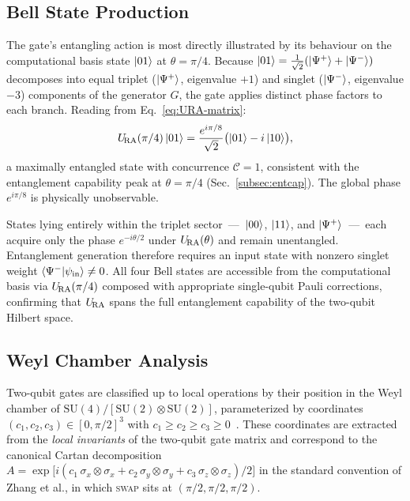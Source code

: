 \subsection{Bell State Production}
\label{subsec:bell}

The gate's entangling action is most directly illustrated by its
behaviour on the computational basis state $\ket{01}$ at $\theta = \pi/4$.
Because $\ket{01} = \tfrac{1}{\sqrt{2}}(\ket{\Psi^+} + \ket{\Psi^-})$
decomposes into equal triplet ($\ket{\Psi^+}$, eigenvalue $+1$) and
singlet ($\ket{\Psi^-}$, eigenvalue $-3$) components of the generator $G$,
the gate applies distinct phase factors to each branch.
Reading from Eq.~\eqref{eq:URA-matrix}:
\begin{equation}
  U_{\!\mathrm{RA}}(\pi/4)\ket{01}
    = \frac{e^{i\pi/8}}{\sqrt{2}}\bigl(\ket{01} - i\ket{10}\bigr),
  \label{eq:bell-production}
\end{equation}
a maximally entangled state with concurrence $\mathcal{C} = 1$,
consistent with the entanglement capability peak at $\theta = \pi/4$
(Sec.~\ref{subsec:entcap}).
The global phase $e^{i\pi/8}$ is physically unobservable.

States lying entirely within the triplet sector~---~$\ket{00}$, $\ket{11}$,
and $\ket{\Psi^+}$~---~each acquire only the phase $e^{-i\theta/2}$ under
$U_{\!\mathrm{RA}}(\theta)$ and remain unentangled.
Entanglement generation therefore requires an input state with nonzero
singlet weight $\langle\Psi^-\vert\psi_{\rm in}\rangle \neq 0$.
All four Bell states are accessible from the computational basis via
$U_{\!\mathrm{RA}}(\pi/4)$ composed with appropriate single-qubit Pauli corrections,
confirming that $U_{\!\mathrm{RA}}$ spans the full entanglement capability of the
two-qubit Hilbert space.

\subsection{Weyl Chamber Analysis}
\label{subsec:weyl}

Two-qubit gates are classified up to local operations by their position in
the Weyl chamber of $\mathrm{SU}(4)/[\mathrm{SU}(2)\otimes\mathrm{SU}(2)]$,
parameterized by coordinates $(c_1, c_2, c_3) \in [0,\pi/2]^3$ with
$c_1 \geq c_2 \geq c_3 \geq 0$~\cite{Zhang2003WeylChamber}.
These coordinates are extracted from the \emph{local invariants} of the
two-qubit gate matrix and correspond to the canonical Cartan
decomposition $A = \exp\!\bigl[i(c_1\,\sigma_x{\otimes}\sigma_x +
c_2\,\sigma_y{\otimes}\sigma_y + c_3\,\sigma_z{\otimes}\sigma_z)/2\bigr]$
in the standard convention of Zhang et al., in which \textsc{swap}
sits at $(\pi/2, \pi/2, \pi/2)$.

